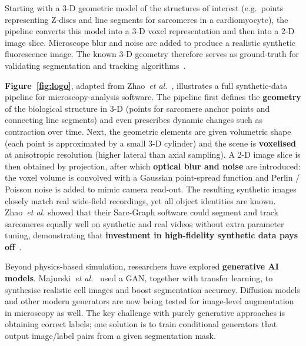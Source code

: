 \documentclass[
oneside,      %
openany       %
]{imc-inf}
\begin{document}
	
	\FloatBarrier %
	
	
	
	Starting with a 3-D geometric model of the structures of interest (e.g.\ points
	representing Z-discs and line segments for sarcomeres in a cardiomyocyte), the
	pipeline converts this model into a 3-D voxel representation and then into a
	2-D image slice.  Microscope blur and noise are added to produce a realistic
	synthetic fluorescence image.  The known 3-D geometry therefore serves as
	ground-truth for validating segmentation and tracking
	algorithms~\cite{zhao2021}.
	
	\medskip
	
	\textbf{Figure~\ref{fig:logo}}, adapted from Zhao~\textit{et al.}~\cite{zhao2021},
	illustrates a full synthetic-data pipeline for microscopy-analysis software.
	The pipeline first defines the \textbf{geometry} of the biological structure in
	3-D (points for sarcomere anchor points and connecting line segments) and even
	prescribes dynamic changes such as contraction over time.  Next, the geometric
	elements are given volumetric shape (each point is approximated by a small 3-D
	cylinder) and the scene is \textbf{voxelised} at anisotropic resolution
	(higher lateral than axial sampling).  A 2-D image slice is then obtained by
	projection, after which \textbf{optical blur and noise} are introduced: the
	voxel volume is convolved with a Gaussian point-spread function and Perlin /
	Poisson noise is added to mimic camera read-out.  The resulting synthetic
	images closely match real wide-field recordings, yet all object identities are
	known.  Zhao~\textit{et al.} showed that their Sarc-Graph software could
	segment and track sarcomeres equally well on synthetic and real videos without
	extra parameter tuning, demonstrating that \textbf{investment in high-fidelity
		synthetic data pays off}~\cite{zhao2021}.
	
	\medskip
	Beyond physics-based simulation, researchers have explored \textbf{generative AI models}.  Majurski~\textit{et al.}~\cite{majurski2019gan} used a GAN, together with transfer learning, to synthesise realistic cell images and
	boost segmentation accuracy.  Diffusion models and other modern generators are now being tested for image-level augmentation in microscopy as well.  The key challenge with purely generative approaches is obtaining correct labels; one solution is to train conditional generators that output image/label pairs from a given segmentation mask.
	
\end{document}
